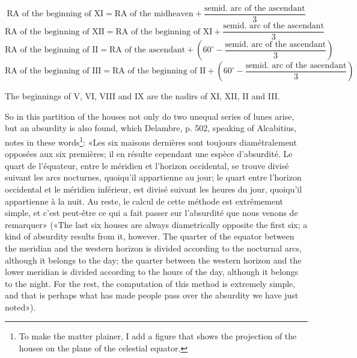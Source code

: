 \documentclass[11pt]{article}
\newcommand{\Pg}[1]{\marginpar{\footnotesize\color{gray}#1}}
\begin{document}
\Pg{I 249}\par\smallskip\[\text{RA of the beginning of XI} = \text{RA of the midheaven} + \dfrac{\text{semid. arc of the ascendant}}{3}\]
\[\text{RA of the beginning of XII} = \text{RA of the beginning of XI} + \dfrac{\text{semid. arc of the ascendant}}{3}\]
\[\text{RA of the beginning of II} = \text{RA of the ascendant} + \left(60^\circ - \dfrac{\text{semid. arc of the ascendant}}{3}\right)\]
\[\text{RA of the beginning of III} = \text{RA of the beginning of II} + \left(60^\circ - \dfrac{\text{semid. arc of the ascendant}}{3}\right)\]\par\smallskip
\par The beginnings of V, VI, VIII and IX are the nadirs of XI, XII, II and III.\par
\begin{center}\end{center}
\par So in this partition of the houses not only do two unequal series of lunes arise, but an absurdity is also found, which Delambre, p. 502, speaking of Alcabitius, notes in these words\footnote{To make the matter plainer, I add a figure that shows the projection of the houses on the plane of the celestial equator.}: «Les six maisons dernières sont toujours diamétralement opposées aux six premières; il en résulte cependant une espèce d’absurdité. Le quart de l’équateur, entre le méridien et l’horizon occidental, se trouve divisé suivant les arcs nocturnes, quoiqu’il appartienne au jour; le quart entre l’horizon occidental et le méridien inférieur, est divisé suivant les heures du jour, quoiqu’il appartienne à la nuit. Au reste, le calcul de cette méthode est extrêmement simple, et c’est peut-être ce qui a fait passer sur l’absurdité que nous venons de remarquer» («The last six houses are always diametrically opposite the first six; a kind of absurdity results from it, however. The quarter of the equator between the meridian and the western horizon is divided according to the nocturnal arcs, although it belongs to the day; the quarter between the western horizon and the lower meridian is divided according to the hours of the day, although it belongs to the night. For the rest, the computation of this method is extremely simple, and that is perhaps what has made people pass over the absurdity we have just noted»).\par
\end{document}
